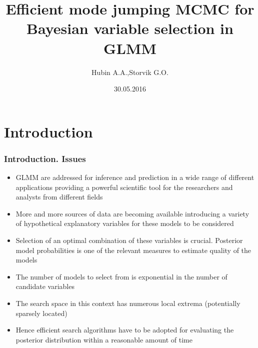 \documentclass{beamer}
\title[Bayesian Model Selection]{Efficient mode jumping MCMC for Bayesian variable selection in GLMM} %
\author[Aliaksandr Hubin]{Hubin A.A.,Storvik G.O.}
\institute[University of Oslo] %
{
Department of Mathematics, University of Oslo \\\medskip \textit{aliaksah@math.uio.no}, \textit{geirs@math.uio.no}\\\texttt{[image: 1-2-logo-universitetet-i-oslo.jpg]}\\ %
UiO, Department of Astrophysics, Oslo
}
\date{30.05.2016} %
\begin{document}
\begin{frame}
\titlepage %
\end{frame}




\section{Introduction}

\begin{frame}
\frametitle{Introduction. Issues}

\begin{itemize}
\item GLMM are addressed for inference and prediction in a wide range of different applications providing a powerful scientific tool for the researchers and analysts from different fields
\item More and more sources of data are becoming available introducing a variety of hypothetical explanatory variables for these models to be considered
\item Selection of an optimal combination of these variables is crucial. Posterior model probabilities is one of the relevant measures to estimate quality of the models
\item The number of models to select from is exponential in the number of candidate variables
\item The search space in this context has numerous local extrema (potentially sparsely located)
\item Hence efficient search algorithms have to be adopted for evaluating the posterior distribution within a reasonable amount of time
\end{itemize}

\end{frame}
\end{document}

